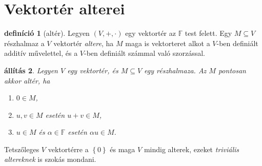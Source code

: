 \documentclass[a4paper, showtrims]{memoir}
\theoremstyle{plain}
\newtheorem{proposition}{állítás}[chapter]
\theoremstyle{remark}
\theoremstyle{definition}
\newtheorem{definition}[proposition]{definíció}
\begin{document}
\section{Vektortér alterei}
\begin{definition}[altér]
	Legyen $\left( V,+,\cdot \right)$ egy vektortér az $\mathbb{F}$ test felett.
	Egy $M\subseteq V$ részhalmaz a $V$ vektortér \emph{altere},
	ha $M$ maga is vektorteret alkot a $V$-ben definiált additív művelettel,
	és a $V$-ben definiált számmal való szorzással.
\end{definition}
\begin{proposition}
	Legyen $V$ egy vektortér, és $M\subseteq V$ egy részhalmaza.
	Az $M$ pontosan akkor altér,
	ha
	\begin{enumerate}
		\item $0\in M$,
		\item $u,v\in M$ esetén $u+v\in M$,
		\item $u\in M$ és $\alpha\in\mathbb{F}$ esetén $\alpha u\in M$.\qedhere
	\end{enumerate}
\end{proposition}
Tetszőleges $V$ vektortérre a $\left\{ 0 \right\}$ és maga $V$ mindig alterek,
ezeket \emph{triviális altereknek} is szokás mondani.
\end{document}
